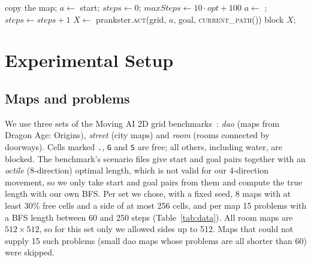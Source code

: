 \documentclass[conference,12pt]{IEEEtran}
\begin{document}
\begin{algorithm}[!t]
\caption{One run (one trip of the character)}
\label{alg:run}
\begin{algorithmic}[1]
\State copy the map; $a\gets$ start; 
\State $\mathit{steps}\gets 0$; $\mathit{maxSteps}\gets 10\cdot\mathit{opt}+100$
  \State $a\gets$ ; $\mathit{steps}\gets\mathit{steps}+1$
    \State $X\gets$ prankster.\textsc{act}(grid, $a$, goal, \textsc{current\_path}())
      \State block $X$;  
    \Else
      \State {}
    \EndIf
  \Else
    \State {}
  \EndIf
\EndWhile
\end{algorithmic}
\end{algorithm}

\section{Experimental Setup}
\label{sec:setup}

\subsection{Maps and problems}
We use three sets of the Moving AI 2D grid benchmarks~\cite{sturtevant2012benchmarks}:
\emph{dao} (maps from Dragon Age: Origins), \emph{street} (city maps) and \emph{room} (rooms
connected by doorways). Cells marked \texttt{.}, \texttt{G} and \texttt{S} are free; all
others, including water, are blocked. The benchmark's scenario files give start and goal pairs
together with an \emph{octile} (8-direction) optimal length, which is not valid for our
4-direction movement, so we only take start and goal pairs from them and compute the true
length with our own BFS. Per set we chose, with a fixed seed, 8 maps with at least 30\% free
cells and a side of at most 256 cells, and per map 15 problems with a BFS length between 60 and
250 steps (Table~\ref{tab:data}). All room maps are $512\times512$, so for this set only we
allowed sides up to 512. Maps that could not supply 15 such problems (small dao maps whose
problems are all shorter than 60) were skipped.
\end{document}
